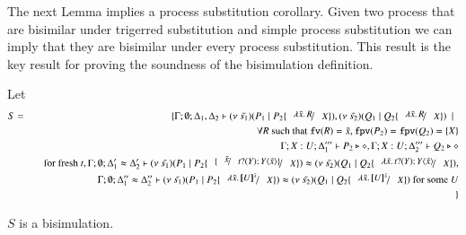 \begin{comment}
	\noi {\bf Induction step:}

	\noi - Case: $Q \Par R \by{\bactout{s}{(x) P}} Q' \Par R$ and
	\[
		\Gamma; \emptyset; \Delta_1 \proves Q \Par R \hastype \Proc
	\]
	\noi Type rule $\trule{Par}$ implies
	\begin{eqnarray}
		\Gamma; \emptyset; \Delta_1' &\proves& Q \hastype \Proc\\
		\Gamma; \emptyset; \Delta_1'' &\proves& R \hastype \Proc \label{lem:aux3}
	\end{eqnarray}
	\noi From the induction hypothesis we get that 
	\begin{eqnarray*}
		\Gamma; \emptyset; \Delta_2' \proves Q' \Par P \hastype \Proc
	\end{eqnarray*}
	we apply rule $\trule{Par}$ to the latter judgement and judgement~\ref{lem:aux3} to get
	\begin{eqnarray*}
		\Gamma; \emptyset; \Delta_2' \cup \Delta'' \proves Q' \Par R \Par P \hastype \Proc
	\end{eqnarray*}

	The rest of the cases enjoy similar argumentation.
\end{proof}

\end{comment}


The next Lemma implies a process substitution corollary.
Given two process that are bisimilar under trigerred substitution
and simple process substitution we can imply that they are
bisimilar under every process substitution. This result is
the key result for proving the soundness of the bisimulation
definition.
 
\begin{lemma}\rm
	\label{lem:subst_equiv}
	Let 
	\begin{eqnarray*}
		S &=& \set{ \Gamma; \es; \Delta_1, \Delta_2 \proves \newsp{\tilde{s_1}}{P_1 \Par P_2 \subst{\abs{\tilde{x}}{R}}{X}}, \newsp{\tilde{s_2}}{Q_1 \Par Q_2 \subst{\abs{\tilde{x}}{R}}{X}} \setbar \\
		&& \quad \forall R \textrm{ such that } \fv{R} = \tilde{x}, \fpv{P_2} = \fpv{Q_2} = \set{X}\\
		&& \quad \Gamma; X: U; \Delta_1''' \proves P_2 \hastype \Proc, \Gamma; X: U; \Delta_2''' \proves Q_2 \hastype \Proc\\
		&& \quad \textrm{for fresh } t, \Gamma; \es; \Delta_1' \wb \Delta_2' \proves \newsp{\tilde{s_1}}{P_1 \Par P_2 \subst{\subst{\tilde{x}}{\binp{t}{Y} \appl{Y}{\tilde{x}}}}{X}} \wb \newsp{\tilde{s_2}}{Q_1 \Par Q_2 \subst{\abs{\tilde{x}}{\binp{t}{Y} \appl{Y}{\tilde{x}}}}{X}}, \\
		&& \quad \Gamma; \es; \Delta_1'' \wb \Delta_2'' \proves \newsp{\tilde{s_1}}{P_1 \Par P_2 \subst{\abs{\tilde{x}}{\map{U}^{\tilde{x}}}}{X}} \wb \newsp{\tilde{s_2}}{Q_1 \Par Q_2 \subst{\abs{\tilde{x}}{\map{U}^{\tilde{x}}}}{X}} \textrm{ for some } U \\
		&&}
	\end{eqnarray*}

	$S$ is a bisimulation.
\end{lemma}


